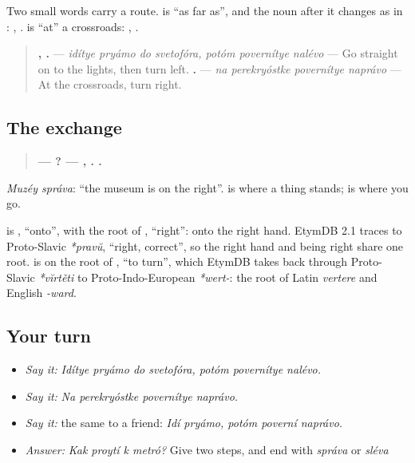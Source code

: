 \begin{grammarlens}[title={Grammar Lens: as far as, and at}]
Two small words carry a route. \textbf{} is \textquotedblleft{}as far as\textquotedblright{}, and the noun after it changes as in \emph{ }: \emph{}, \textbf{ }. \textbf{} is \textquotedblleft{}at\textquotedblright{} a crossroads: \emph{}, \textbf{ }.

\begin{quote}
\textbf{   ,   .} — \emph{idítye pryámo do svetofóra, potóm povernítye nalévo} — Go straight on to the lights, then turn left. \textbf{   .} — \emph{na perekryóstke povernítye naprávo} — At the crossroads, turn right.
\end{quote}
\end{grammarlens}

\subsection*{The exchange}
\begin{quote}
\textbf{—    ? —  ,  .  .}
\end{quote}

\emph{Muzéy správa}: \textquotedblleft{}the museum is on the right\textquotedblright{}. \textbf{} is where a thing stands; \textbf{} is where you go.

\begin{cousinweb}
\textbf{} is \emph{}, \textquotedblleft{}onto\textquotedblright{}, with the root of \emph{}, \textquotedblleft{}right\textquotedblright{}: onto the right hand. EtymDB 2.1 traces \emph{} to Proto-Slavic \emph{*pravŭ}, \textquotedblleft{}right, correct\textquotedblright{}, so the right hand and being right share one root. \textbf{} is on the root of \emph{}, \textquotedblleft{}to turn\textquotedblright{}, which EtymDB takes back through Proto-Slavic \emph{*vĭrtěti} to Proto-Indo-European \emph{*wert-}: the root of Latin \emph{vertere} and English \emph{-ward}.
\end{cousinweb}

\subsection*{Your turn}
\begin{itemize}
\raggedright
  \item \emph{Say it:} \emph{Idítye pryámo do svetofóra, potóm povernítye nalévo.}
  \item \emph{Say it:} \emph{Na perekryóstke povernítye naprávo.}
  \item \emph{Say it:} the same to a friend: \emph{Idí pryámo, potóm poverní naprávo.}
  \item \emph{Answer:} \emph{Kak proytí k metró?} Give two steps, and end with \emph{správa} or \emph{sléva}
\end{itemize}

